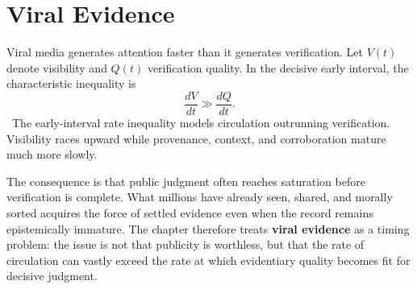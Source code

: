 
\chapter{Viral Evidence}
\label{ch:ch067}


Viral media generates attention faster than it generates verification. Let \(V(t)\) denote visibility and \(Q(t)\) verification quality. In the decisive early interval, the characteristic inequality is
\[
\frac{dV}{dt}\gg\frac{dQ}{dt}.
\]
\ToyModel\ The early-interval rate inequality models circulation outrunning verification.
Visibility races upward while provenance, context, and corroboration mature much more slowly.

The consequence is that public judgment often reaches saturation before verification is complete. What millions have already seen, shared, and morally sorted acquires the force of settled evidence even when the record remains epistemically immature. The chapter therefore treats \textbf{viral evidence} as a timing problem: the issue is not that publicity is worthless, but that the rate of circulation can vastly exceed the rate at which evidentiary quality becomes fit for decisive judgment.

